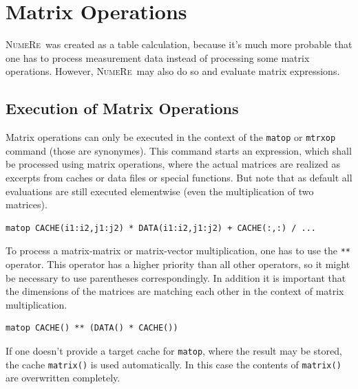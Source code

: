 \documentclass[DIV=14,headsepline,footsepline]{scrbook}
\newcommand{\NR}{\textsc{Nu\-me\-Re}}
\begin{document}
		\chapter{Matrix Operations}
			\NR\ was created as a table calculation, because it's much more probable that one has to process measurement data instead of processing some matrix operations. However, \NR\ may also do so and evaluate matrix expressions.
			\section{Execution of Matrix Operations}
				Matrix operations can only be executed in the context of the \lstinline+matop+ or \lstinline+mtrxop+ command (those are synonymes). This command starts an expression, which shall be processed using matrix operations, where the actual matrices are realized as excerpts from caches or data files or special functions. But note that as default all evaluations are still executed elementwise (even the multiplication of two matrices).
				\begin{lstlisting}
matop CACHE(i1:i2,j1:j2) * DATA(i1:i2,j1:j2) + CACHE(:,:) / ...
				\end{lstlisting}
				
				To process a matrix-matrix or matrix-vector multiplication, one has to use the \lstinline+**+ operator. This operator has a higher priority than all other operators, so it might be necessary to use parentheses correspondingly. In addition it is important that the dimensions of the matrices are matching each other in the context of matrix multiplication.
				\begin{lstlisting}
matop CACHE() ** (DATA() * CACHE())
				\end{lstlisting}
				
				If one doesn't provide a target cache for \lstinline+matop+, where the result may be stored, the cache \lstinline+matrix()+ is used automatically. In this case the contents of \lstinline+matrix()+ are overwritten completely.
				
\end{document}
